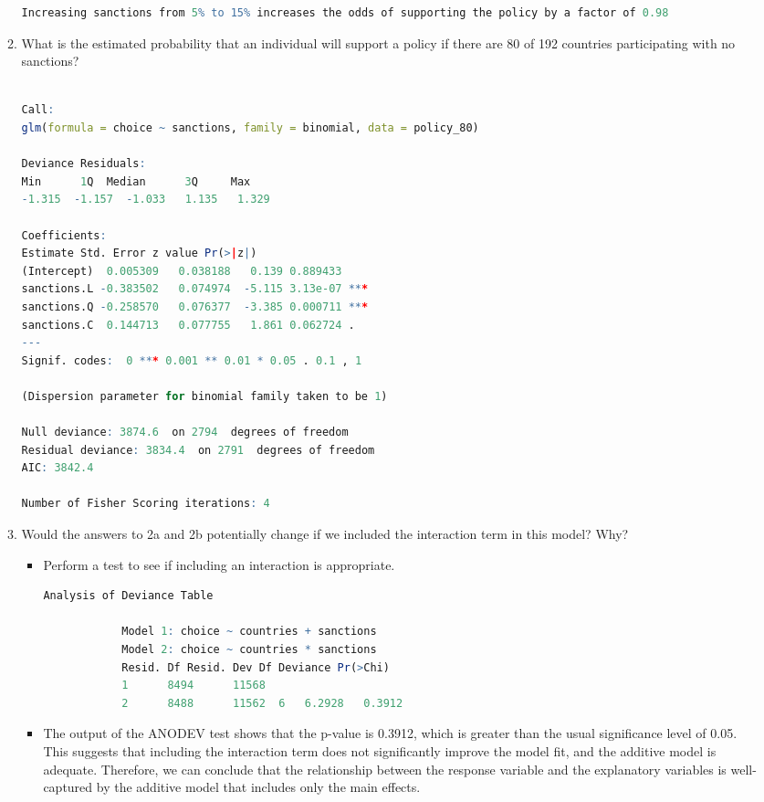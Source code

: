 \documentclass[12pt,letterpaper]{article}
\begin{document}
\begin{enumerate}
\begin{enumerate}
  
\begin{lstlisting}[language=R]
Increasing sanctions from 5% to 15% increases the odds of supporting the policy by a factor of 0.98 
\end{lstlisting}
	
		\item
		What is the estimated probability that an individual will support a policy if there are 80 of 192 countries participating with no sanctions? 
  
\begin{lstlisting}[language=R]

Call:
glm(formula = choice ~ sanctions, family = binomial, data = policy_80)

Deviance Residuals: 
Min      1Q  Median      3Q     Max  
-1.315  -1.157  -1.033   1.135   1.329  

Coefficients:
Estimate Std. Error z value Pr(>|z|)    
(Intercept)  0.005309   0.038188   0.139 0.889433    
sanctions.L -0.383502   0.074974  -5.115 3.13e-07 ***
sanctions.Q -0.258570   0.076377  -3.385 0.000711 ***
sanctions.C  0.144713   0.077755   1.861 0.062724 .  
---
Signif. codes:  0 *** 0.001 ** 0.01 * 0.05 . 0.1 , 1

(Dispersion parameter for binomial family taken to be 1)

Null deviance: 3874.6  on 2794  degrees of freedom
Residual deviance: 3834.4  on 2791  degrees of freedom
AIC: 3842.4

Number of Fisher Scoring iterations: 4

\end{lstlisting}
		\item
		Would the answers to 2a and 2b potentially change if we included the interaction term in this model? Why? 
		\begin{itemize}
			\item Perform a test to see if including an interaction is appropriate.
			  
			\begin{lstlisting}[language=R]
			Analysis of Deviance Table
			
			Model 1: choice ~ countries + sanctions
			Model 2: choice ~ countries * sanctions
			Resid. Df Resid. Dev Df Deviance Pr(>Chi)
			1      8494      11568                     
			2      8488      11562  6   6.2928   0.3912
			\end{lstlisting}
		\item The output of the ANODEV test shows that the p-value is 0.3912, which is greater than the usual significance level of 0.05. This suggests that including the interaction term does not significantly improve the model fit, and the additive model is adequate. Therefore, we can conclude that the relationship between the response variable and the explanatory variables is well-captured by the additive model that includes only the main effects.
		
		\end{itemize}
	\end{enumerate}
	\end{enumerate}
\end{document}
